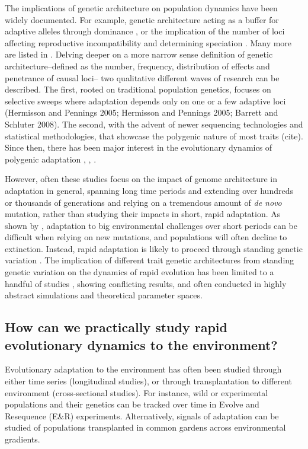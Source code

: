 \documentclass{article}
\begin{document}
The implications of genetic architecture on population dynamics have been widely documented. For example, genetic architecture acting as a buffer for adaptive alleles through dominance \citep{Yamamichi2017-uj}, or the implication of the number of loci affecting reproductive incompatibility and determining speciation \citep{Orr1996-eq}. Many more are listed in \citep{Bertram2019-sg}. Delving deeper on a more narrow sense definition of genetic architecture--defined as the number, frequency, distribution of effects and penetrance of causal loci-- two qualitative different waves of research can be described. The first, rooted on traditional population genetics, focuses on selective sweeps where adaptation depends only on one or a few adaptive loci (Hermisson and Pennings 2005;  Hermisson and Pennings 2005; Barrett and Schluter 2008). The second, with the advent of newer sequencing technologies and statistical methodologies, that showcase the polygenic nature of most traits (cite). Since then, there has been major interest in the evolutionary dynamics of polygenic adaptation \citep{John2020-xc}  \citep{Jain2017-mb}, \citep{Barghi2020-aa} \citep{Hayward2021-ji, Stetter2018-st, Thornton2019-ww},  \citep{Hollinger2019-lb}. 

However, often these studies focus on the impact of genome architecture in adaptation in general, spanning long time periods and extending over hundreds or thousands of generations and relying on a tremendous amount of \textit{de novo} mutation, rather than studying their impacts in short, rapid adaptation. As shown by \citep{Orr2008-jl}, adaptation to big environmental challenges over short periods can be difficult when relying on new mutations, and populations will often decline to extinction. Instead, rapid adaptation is likely to proceed through standing genetic variation \citep{Barrett2008-tj}. The implication of different trait genetic architectures from standing genetic variation on the dynamics of rapid evolution has been limited to a handful of studies \citep{Gomulkiewicz2010-wr, Kardos2021-jd}, showing conflicting results, and often conducted in highly abstract simulations and theoretical parameter spaces.

\subsection{How can we practically study rapid evolutionary dynamics to the environment? }
Evolutionary adaptation to the environment has often been studied through either time series (longitudinal studies), or through transplantation to different environment (cross-sectional studies). For instance, wild or experimental populations and their genetics can be tracked over time in Evolve and Resequence (E\&R) experiments. Alternatively, signals of adaptation can be studied of populations transplanted in common gardens across environmental gradients. 
\end{document}
